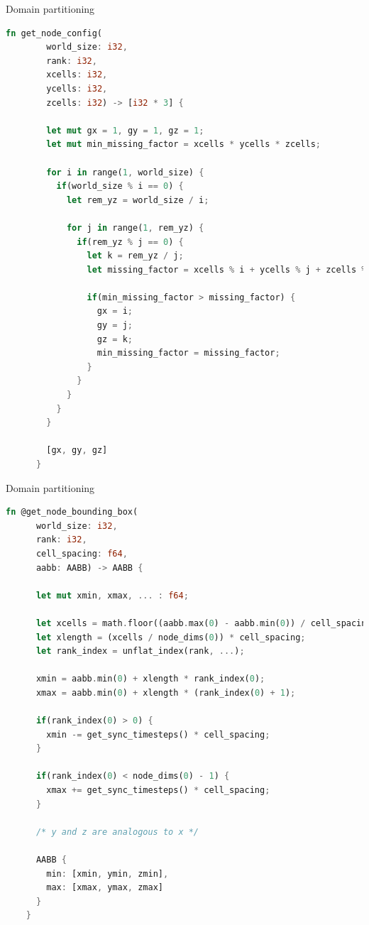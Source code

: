 \documentclass[aspectratio=43,t]{beamer}
\begin{document}
  \begin{frame}[fragile]{Domain partitioning}
    \begin{lstlisting}[basicstyle=\tiny\ttfamily,language=Rust]
      fn get_node_config(
        world_size: i32,
        rank: i32,
        xcells: i32, 
        ycells: i32, 
        zcells: i32) -> [i32 * 3] { 

        let mut gx = 1, gy = 1, gz = 1; 
        let mut min_missing_factor = xcells * ycells * zcells;

        for i in range(1, world_size) {
          if(world_size % i == 0) { 
            let rem_yz = world_size / i; 

            for j in range(1, rem_yz) {
              if(rem_yz % j == 0) { 
                let k = rem_yz / j; 
                let missing_factor = xcells % i + ycells % j + zcells % k; 

                if(min_missing_factor > missing_factor) {
                  gx = i; 
                  gy = j; 
                  gz = k; 
                  min_missing_factor = missing_factor;
                }
              }
            }    
          }    
        }

        [gx, gy, gz]
      }
    \end{lstlisting}
  \end{frame}

  \begin{frame}[fragile]{Domain partitioning}
    \begin{lstlisting}[basicstyle=\tiny\ttfamily,language=Rust]
    fn @get_node_bounding_box(
      world_size: i32,
      rank: i32,
      cell_spacing: f64,
      aabb: AABB) -> AABB {

      let mut xmin, xmax, ... : f64;

      let xcells = math.floor((aabb.max(0) - aabb.min(0)) / cell_spacing);
      let xlength = (xcells / node_dims(0)) * cell_spacing;
      let rank_index = unflat_index(rank, ...);

      xmin = aabb.min(0) + xlength * rank_index(0);
      xmax = aabb.min(0) + xlength * (rank_index(0) + 1);

      if(rank_index(0) > 0) {
        xmin -= get_sync_timesteps() * cell_spacing;
      }

      if(rank_index(0) < node_dims(0) - 1) {
        xmax += get_sync_timesteps() * cell_spacing;
      }

      /* y and z are analogous to x */

      AABB {
        min: [xmin, ymin, zmin],
        max: [xmax, ymax, zmax]
      }
    }
    \end{lstlisting}
  \end{frame}
\end{document}

